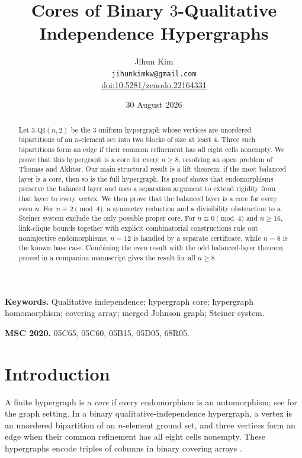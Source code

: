 \documentclass[11pt]{article}
\title{Cores of Binary \(3\)-Qualitative Independence Hypergraphs}
\author{Jihun Kim\\
\small \texttt{jihunkimkw@gmail.com}\\
\small \href{https://doi.org/10.5281/zenodo.22164331}{doi:10.5281/zenodo.22164331}}
\date{30 August 2026}
\begin{document}
\maketitle

\begin{abstract}
Let \(3\text{-}\mathrm{QI}(n,2)\) be the \(3\)-uniform hypergraph whose
vertices are unordered bipartitions of an \(n\)-element set into two blocks
of size at least \(4\).  Three such bipartitions form an edge if their common
refinement has all eight cells nonempty.  We prove that this hypergraph is a
core for every \(n\ge8\), resolving an open problem of Thomas and Akhtar.
Our main structural result is a lift theorem: if the most balanced
layer is a core, then so is the full hypergraph.  Its proof shows that
endomorphisms preserve the balanced layer and uses a separation argument to
extend rigidity from that layer to every vertex.  We then prove that the
balanced layer is a core for every even \(n\).  For
\(n\equiv2\pmod4\), a symmetry reduction and a divisibility
obstruction to a Steiner system exclude the only possible proper core.  For
\(n\equiv0\pmod4\) and \(n\ge16\), link-clique bounds together with explicit
combinatorial constructions rule out noninjective endomorphisms; \(n=12\) is
handled by a separate certificate, while \(n=8\) is the known base case.
Combining the even result with the odd balanced-layer
theorem proved in a companion manuscript gives the result for all \(n\ge8\).
\end{abstract}

\medskip
\noindent\textbf{Keywords.}
Qualitative independence; hypergraph core; hypergraph homomorphism; covering
array; merged Johnson graph; Steiner system.

\medskip
\noindent\textbf{MSC 2020.}
05C65, 05C60, 05B15, 05D05, 68R05.

\section{Introduction}

A finite hypergraph is a \emph{core} if every endomorphism is an
automorphism; see \cite{HellNesetril2004} for the graph setting.  In a binary
qualitative-independence hypergraph, a vertex is an unordered bipartition of
an \(n\)-element ground set, and three vertices form an edge when their common
refinement has all eight cells nonempty.  These hypergraphs encode triples of
columns in binary covering arrays
\cite{MeagherStevens2005,AkhtarMaity2017}.
\end{document}
